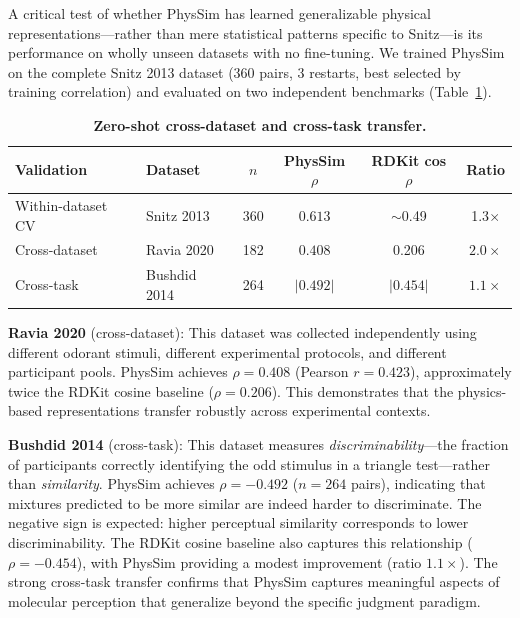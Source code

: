 \documentclass[11pt,a4paper]{article}
\begin{document}
A critical test of whether PhysSim has learned generalizable physical representations---rather than mere statistical patterns specific to Snitz---is its performance on wholly unseen datasets with no fine-tuning. We trained PhysSim on the complete Snitz 2013 dataset (360 pairs, 3 restarts, best selected by training correlation) and evaluated on two independent benchmarks (Table~\ref{tab:transfer}).

\begin{table}[h]
\centering
\caption{\textbf{Zero-shot cross-dataset and cross-task transfer.}}
\label{tab:transfer}
\begin{tabular}{llcccc}
\toprule
\textbf{Validation} & \textbf{Dataset} & $n$ & \textbf{PhysSim $\rho$} & \textbf{RDKit cos $\rho$} & \textbf{Ratio} \\
\midrule
Within-dataset CV & Snitz 2013 & 360 & $\mathbf{0.613}$ & $\sim$0.49 & 1.3$\times$ \\
Cross-dataset & Ravia 2020 & 182 & $\mathbf{0.408}$ & 0.206 & $\mathbf{2.0\times}$ \\
Cross-task & Bushdid 2014 & 264 & $\mathbf{|0.492|}$ & $|0.454|$ & $\mathbf{1.1\times}$ \\
\bottomrule
\end{tabular}
\end{table}

\textbf{Ravia 2020} (cross-dataset): This dataset was collected independently using different odorant stimuli, different experimental protocols, and different participant pools. PhysSim achieves $\rho = 0.408$ (Pearson $r = 0.423$), approximately twice the RDKit cosine baseline ($\rho = 0.206$). This demonstrates that the physics-based representations transfer robustly across experimental contexts.

\textbf{Bushdid 2014} (cross-task): This dataset measures \emph{discriminability}---the fraction of participants correctly identifying the odd stimulus in a triangle test---rather than \emph{similarity}. PhysSim achieves $\rho = -0.492$ ($n = 264$ pairs), indicating that mixtures predicted to be more similar are indeed harder to discriminate. The negative sign is expected: higher perceptual similarity corresponds to lower discriminability. The RDKit cosine baseline also captures this relationship ($\rho = -0.454$), with PhysSim providing a modest improvement (ratio $1.1\times$). The strong cross-task transfer confirms that PhysSim captures meaningful aspects of molecular perception that generalize beyond the specific judgment paradigm.
\end{document}
